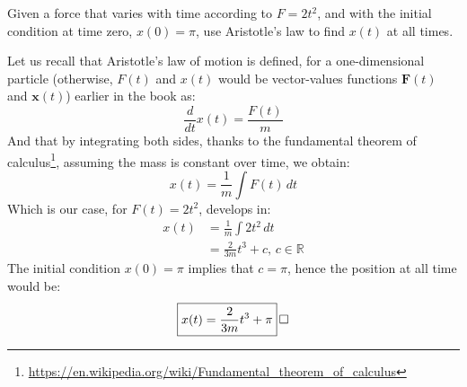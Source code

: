 \documentclass[solutions.tex]{subfiles}
\begin{document}
\maketitle
\begin{exercise}
Given a force that varies with time according to $F = 2t^2$,
and with the initial condition at time zero, $x(0) = \pi$, use
Aristotle's law to find $x(t)$ at all times.
\end{exercise}
Let us recall that Aristotle's law of motion is defined, for a
one-dimensional particle (otherwise, $F(t)$ and $x(t)$ would be
vector-values functions $\bm{F}(t)$ and $\bm{x}(t)$) earlier
in the book as:
\[
	\frac{d}{dt}x(t) = \frac{F(t)}{m}
\]
And that by integrating both sides, thanks to the fundamental
theorem of calculus\footnote{\url{
https://en.wikipedia.org/wiki/Fundamental\_theorem_of\_calculus}},
assuming the mass is constant over time, we obtain:
\[
	x(t) = \frac{1}{m} \int F(t)\,dt
\]
Which is our case, for $F(t) = 2t^2$, develops in:
\begin{align*}
	x(t) &= \frac{1}{m} \int 2t^2\,dt \\
	~ &= \frac{2}{3m}t^3+c,\,c\in\mathbb{R}
\end{align*}
The initial condition $x(0)=\pi$ implies that $c=\pi$, hence the position
at all time would be:
\[
	\boxed{x(t) = \frac{2}{3m}t^3+\pi} \qed
\]
\end{document}
